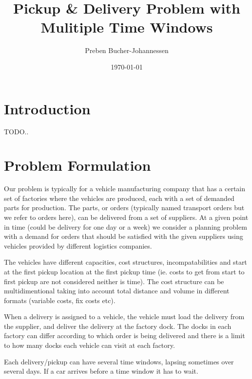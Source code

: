\documentclass[a4paper,12pt]{article}
\begin{document}
\title{Pickup \& Delivery Problem with Mulitiple Time Windows}
\author{Preben Bucher-Johannessen}
\date{\today}
\maketitle

\tableofcontents
\newpage
{}

\section{Introduction}
TODO..

\section{Problem Formulation}
Our problem is typically for a vehicle manufacturing company that has a certain set of factories where the vehicles are produced, each with a set of demanded parts for production. The parts, or orders (typically named transport orders but we refer to orders here), can be delivered from a set of suppliers. At a given point in time (could be delivery for one day or a week) we consider a planning problem with a demand for orders that should be satisfied with the given suppliers using vehicles provided by different logistics companies. \par 
The vehicles have different capacities, cost structures, incompatabilities and start at the first pickup location at the first pickup time (ie. costs to get from start to first pickup are not considered neither is time). The cost structure can be multidimentional taking into account total distance and volume in different formats (variable costs, fix costs etc). \par
When a delivery is assigned to a vehicle, the vehicle must load the delivery from the supplier, and deliver the delivery at the factory dock. The docks in each factory can differ according to which order is being delivered and there is a limit to how many docks each vehicle can visit at each factory. \par
Each delivery/pickup can have several time windows, lapsing sometimes over several days. If a car arrives before a time window it has to wait. \par
\end{document}
